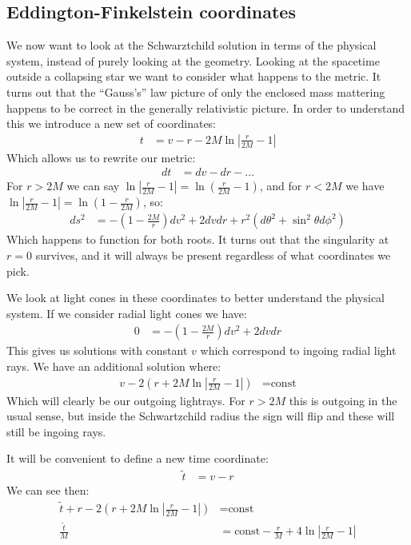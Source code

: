 \subsection{Eddington-Finkelstein coordinates}
We now want to look at the Schwarztchild solution in terms of the physical system, instead of purely looking at the geometry.
Looking at the spacetime outside a collapsing star we want to consider what happens to the metric. It turns out that the ``Gauss's'' law picture of only the enclosed mass mattering happens to be correct in the generally relativistic picture.
In order to understand this we introduce a new set of coordinates:
\begin{align*}
	t &= v-r -2M \ln |\frac{r}{2M}  -1|
\end{align*}
Which allows us to rewrite our metric:
\begin{align*}
	dt &= dv - dr- \ldots
\end{align*}
For $r>2M$ we can say $\ln |\frac{r}{2M} - 1| = \ln \left(\frac{r}{2M}  -1 \right)$, and for $r < 2M$ we have $\ln |\frac{r}{2M} - 1| = \ln\left(1 - \frac{r}{2M}\right)$, so:
\begin{align*}
	ds^2 &= -\left(1-\frac{2M}{r}\right) dv^2 + 2dv dr + r^2(d\theta^2 + \sin^2\theta d\phi^2)
\end{align*}
Which happens to function for both roots. It turns out that the singularity at $r=0$ survives, and it will always be present regardless of what coordinates we pick.

We look at light cones in these coordinates to better understand the physical system. If we consider radial light cones we have:
\begin{align*}
	0 &= -\left(1-\frac{2M}{r}\right) dv^2 + 2dvdr
\end{align*}
This gives us solutions with constant $v$ which correspond to ingoing radial light rays. We have an additional solution where:
\begin{align*}
	v - 2(r+2M\ln|\frac{r}{2M} -1|) &= \text{const}
\end{align*}
Which will clearly be our outgoing lightrays. For $r>2M$ this is outgoing in the usual sense, but inside the Schwartzchild radius the sign will flip and these will still be ingoing rays.

It will be convenient to define a new time coordinate:
\begin{align*}
	\tilde{t} &= v-r
\end{align*}
We can see then:
\begin{align*}
	\tilde{t} + r-2(r+ 2M \ln |\frac{r}{2M} - 1|) &= \text{const} \\
	\frac{\tilde{t}}{M} &= \text{const} - \frac{r}{M} + 4\ln |\frac{r}{2M} - 1|
\end{align*}
